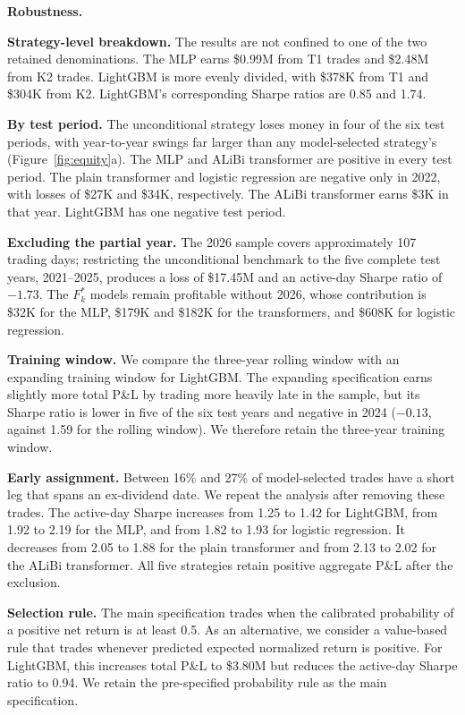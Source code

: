 \documentclass[sigconf,review]{acmart}
\begin{document}
\smallskip\noindent\textbf{Robustness.}
\label{sec:robustness}

\noindent\textbf{Strategy-level breakdown.}
The results are not confined to one of the two retained denominations. The MLP earns \$0.99M from T1 trades and \$2.48M from K2 trades. LightGBM is more evenly divided, with \$378K from T1 and \$304K from K2. LightGBM's corresponding Sharpe ratios are 0.85 and 1.74.

\noindent\textbf{By test period.}
The unconditional strategy loses money in four of the six test periods, with year-to-year swings far larger than any model-selected strategy's (Figure~\ref{fig:equity}a). The MLP and ALiBi transformer are positive in every test period. The plain transformer and logistic regression are negative only in 2022, with losses of \$27K and \$34K, respectively. The ALiBi transformer earns \$3K in that year. LightGBM has one negative test period.

\noindent\textbf{Excluding the partial year.}
The 2026 sample covers approximately 107 trading days; restricting the unconditional benchmark to the five complete test years, 2021--2025, produces a loss of \$17.45M and an active-day Sharpe ratio of $-1.73$. The $F_k^\ast$ models remain profitable without 2026, whose contribution is \$32K for the MLP, \$179K and \$182K for the transformers, and \$608K for logistic regression.

\noindent\textbf{Training window.}
We compare the three-year rolling window with an expanding training window for LightGBM. The expanding specification earns slightly more total P\&L by trading more heavily late in the sample, but its Sharpe ratio is lower in five of the six test years and negative in 2024 ($-0.13$, against 1.59 for the rolling window). We therefore retain the three-year training window.

\noindent\textbf{Early assignment.}
Between 16\% and 27\% of model-selected trades have a short leg that spans an ex-dividend date. We repeat the analysis after removing these trades. The active-day Sharpe increases from 1.25 to 1.42 for LightGBM, from 1.92 to 2.19 for the MLP, and from 1.82 to 1.93 for logistic regression. It decreases from 2.05 to 1.88 for the plain transformer and from 2.13 to 2.02 for the ALiBi transformer. All five strategies retain positive aggregate P\&L after the exclusion.

\noindent\textbf{Selection rule.}
The main specification trades when the calibrated probability of a positive net return is at least 0.5. As an alternative, we consider a value-based rule that trades whenever predicted expected normalized return is positive. For LightGBM, this increases total P\&L to \$3.80M but reduces the active-day Sharpe ratio to 0.94. We retain the pre-specified probability rule as the main specification.
\end{document}
